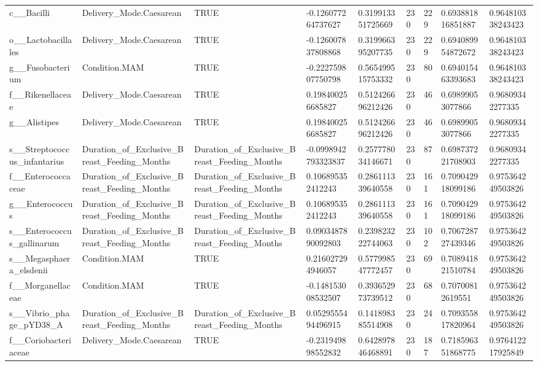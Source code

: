 \begin{longtable}{lllllllll}
c\_\_Bacilli & Delivery\_Mode.Caesarean & TRUE & -0.126077264737627 & 0.319913351725669 & 230 & 229 & 0.693881816851887 & 0.964810338243423 \\
o\_\_Lactobacillales & Delivery\_Mode.Caesarean & TRUE & -0.126007837808868 & 0.319966395207735 & 230 & 229 & 0.694089954872672 & 0.964810338243423 \\
g\_\_Fusobacterium & Condition.MAM & TRUE & -0.222759807750798 & 0.565499515753332 & 230 & 80 & 0.694015463393683 & 0.964810338243423 \\
f\_\_Rikenellaceae & Delivery\_Mode.Caesarean & TRUE & 0.198400256685827 & 0.512426696212426 & 230 & 46 & 0.69899053077866 & 0.96809342277335 \\
g\_\_Alistipes & Delivery\_Mode.Caesarean & TRUE & 0.198400256685827 & 0.512426696212426 & 230 & 46 & 0.69899053077866 & 0.96809342277335 \\
s\_\_Streptococcus\_infantarius & Duration\_of\_Exclusive\_Breast\_Feeding\_Months & Duration\_of\_Exclusive\_Breast\_Feeding\_Months & -0.0998942793323837 & 0.257778034146671 & 230 & 87 & 0.698737221708903 & 0.96809342277335 \\
f\_\_Enterococcaceae & Duration\_of\_Exclusive\_Breast\_Feeding\_Months & Duration\_of\_Exclusive\_Breast\_Feeding\_Months & 0.106895352412243 & 0.286111339640558 & 230 & 161 & 0.709042918099186 & 0.975364249503826 \\
g\_\_Enterococcus & Duration\_of\_Exclusive\_Breast\_Feeding\_Months & Duration\_of\_Exclusive\_Breast\_Feeding\_Months & 0.106895352412243 & 0.286111339640558 & 230 & 161 & 0.709042918099186 & 0.975364249503826 \\
s\_\_Enterococcus\_gallinarum & Duration\_of\_Exclusive\_Breast\_Feeding\_Months & Duration\_of\_Exclusive\_Breast\_Feeding\_Months & 0.0903487890092803 & 0.239823222744063 & 230 & 102 & 0.706728727439346 & 0.975364249503826 \\
s\_\_Megasphaera\_elsdenii & Condition.MAM & TRUE & 0.216027294946057 & 0.577998547772457 & 230 & 69 & 0.708941821510784 & 0.975364249503826 \\
f\_\_Morganellaceae & Condition.MAM & TRUE & -0.148153008532507 & 0.393652973739512 & 230 & 68 & 0.70700812619551 & 0.975364249503826 \\
s\_\_Vibrio\_phage\_pYD38\_A & Duration\_of\_Exclusive\_Breast\_Feeding\_Months & Duration\_of\_Exclusive\_Breast\_Feeding\_Months & 0.0529555494496915 & 0.141898385514908 & 230 & 24 & 0.709355817820964 & 0.975364249503826 \\
f\_\_Coriobacteriaceae & Delivery\_Mode.Caesarean & TRUE & -0.231949898552832 & 0.642897846468891 & 230 & 187 & 0.718596351868775 & 0.976412217925849 \\

\end{longtable}
